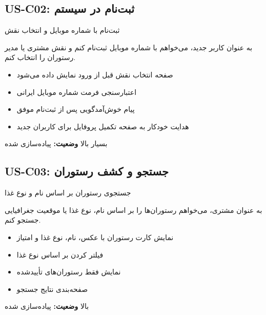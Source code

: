 \documentclass[12pt, a4paper]{article}
\begin{document}
\subsection{US-C02: ثبت‌نام در سیستم}
\begin{description}[rightmargin=0.5cm]
  \item[عنوان:] ثبت‌نام با شماره موبایل و انتخاب نقش
  \item[داستان:] به عنوان کاربر جدید، می‌خواهم با شماره موبایل ثبت‌نام کنم و نقش مشتری
  یا مدیر رستوران را انتخاب کنم.
  \item[معیارهای پذیرش:]
  \begin{itemize}[rightmargin=0.5cm]
    \item صفحه انتخاب نقش قبل از ورود نمایش داده می‌شود
    \item اعتبارسنجی فرمت شماره موبایل ایرانی
    \item پیام خوش‌آمدگویی پس از ثبت‌نام موفق
    \item هدایت خودکار به صفحه تکمیل پروفایل برای کاربران جدید
  \end{itemize}
  \item[اولویت:] بسیار بالا \quad \textbf{وضعیت:} پیاده‌سازی شده
\end{description}

\subsection{US-C03: جستجو و کشف رستوران}
\begin{description}[rightmargin=0.5cm]
  \item[عنوان:] جستجوی رستوران بر اساس نام و نوع غذا
  \item[داستان:] به عنوان مشتری، می‌خواهم رستوران‌ها را بر اساس نام، نوع غذا یا موقعیت
  جغرافیایی جستجو کنم.
  \item[معیارهای پذیرش:]
  \begin{itemize}[rightmargin=0.5cm]
    \item نمایش کارت رستوران با عکس، نام، نوع غذا و امتیاز
    \item فیلتر کردن بر اساس نوع غذا
    \item نمایش فقط رستوران‌های تأییدشده
    \item صفحه‌بندی نتایج جستجو
  \end{itemize}
  \item[اولویت:] بالا \quad \textbf{وضعیت:} پیاده‌سازی شده
\end{description}
\end{document}
